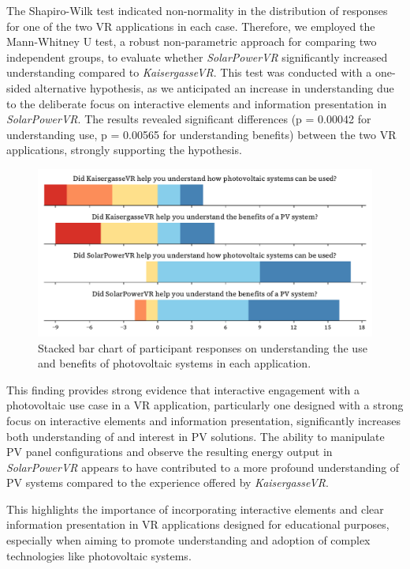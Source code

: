 \documentclass[draft, final]{vutinfth} %
\begin{document}
The Shapiro-Wilk test indicated non-normality in the distribution of responses for one of the two VR applications in each case. Therefore, we employed the Mann-Whitney U test, a robust non-parametric approach for comparing two independent groups, to evaluate whether \textit{SolarPowerVR} significantly increased understanding compared to \textit{KaisergasseVR}. This test was conducted with a one-sided alternative hypothesis, as we anticipated an increase in understanding due to the deliberate focus on interactive elements and information presentation in \textit{SolarPowerVR}.  The results revealed significant differences (p = 0.00042 for understanding use, p = 0.00565 for understanding benefits) between the two VR applications, strongly supporting the hypothesis.

\begin{figure}[h]
    \centering
    \includegraphics[width=\textwidth]{graphics/research-2.pdf}
    \caption{Stacked bar chart of participant responses on understanding the use and benefits of photovoltaic systems in each application.}
    \label{fig:research-2}
\end{figure}


This finding provides strong evidence that interactive engagement with a photovoltaic use case in a VR application, particularly one designed with a strong focus on interactive elements and information presentation, significantly increases both understanding of and interest in PV solutions.  The ability to manipulate PV panel configurations and observe the resulting energy output in \textit{SolarPowerVR} appears to have contributed to a more profound understanding of PV systems compared to the experience offered by \textit{KaisergasseVR}.

This highlights the importance of incorporating interactive elements and clear information presentation in VR applications designed for educational purposes, especially when aiming to promote understanding and adoption of complex technologies like photovoltaic systems.
\end{document}
